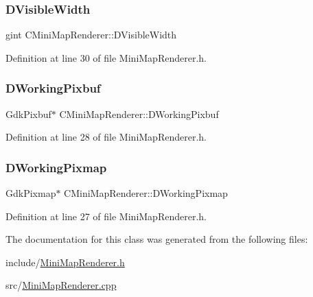 \subsubsection{\texorpdfstring{D\+Visible\+Width}{DVisibleWidth}}
{\footnotesize\ttfamily gint C\+Mini\+Map\+Renderer\+::\+D\+Visible\+Width\hspace{0.3cm}{\ttfamily [protected]}}



Definition at line 30 of file Mini\+Map\+Renderer.\+h.

\hypertarget{classCMiniMapRenderer_ad5f723d83a60882a3e82af72e84ff522}{}\label{classCMiniMapRenderer_ad5f723d83a60882a3e82af72e84ff522} 
\subsubsection{\texorpdfstring{D\+Working\+Pixbuf}{DWorkingPixbuf}}
{\footnotesize\ttfamily Gdk\+Pixbuf$\ast$ C\+Mini\+Map\+Renderer\+::\+D\+Working\+Pixbuf\hspace{0.3cm}{\ttfamily [protected]}}



Definition at line 28 of file Mini\+Map\+Renderer.\+h.

\hypertarget{classCMiniMapRenderer_a53bf622d2048ea136ae256e8d4b81fb5}{}\label{classCMiniMapRenderer_a53bf622d2048ea136ae256e8d4b81fb5} 
\subsubsection{\texorpdfstring{D\+Working\+Pixmap}{DWorkingPixmap}}
{\footnotesize\ttfamily Gdk\+Pixmap$\ast$ C\+Mini\+Map\+Renderer\+::\+D\+Working\+Pixmap\hspace{0.3cm}{\ttfamily [protected]}}



Definition at line 27 of file Mini\+Map\+Renderer.\+h.



The documentation for this class was generated from the following files\+:\begin{DoxyCompactItemize}
\item 
include/\hyperlink{MiniMapRenderer_8h}{Mini\+Map\+Renderer.\+h}\item 
src/\hyperlink{MiniMapRenderer_8cpp}{Mini\+Map\+Renderer.\+cpp}\end{DoxyCompactItemize}
